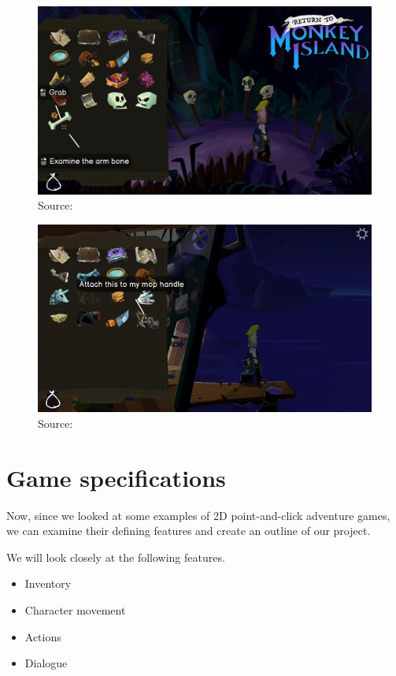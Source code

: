 
\begin{figure}[H]
\centering
\includegraphics[width=.7\linewidth]{img/RtMI1.png}
\caption{Source:  \cite{}}
\label{fig:RtMI1}
\end{figure}

\begin{figure}[H]
\centering
\includegraphics[width=.7\linewidth]{img/RtMI2.png}
\caption{Source:  \cite{}}
\label{fig:RtMI2}
\end{figure}

\section{Game specifications}

Now, since we looked at some examples of 2D point-and-click adventure games, we can examine their defining features and create an outline of our project. 

We will look closely at the following features.
\begin{itemize}
\item Inventory
\item Character movement
\item Actions
\item Dialogue
\end{itemize}

